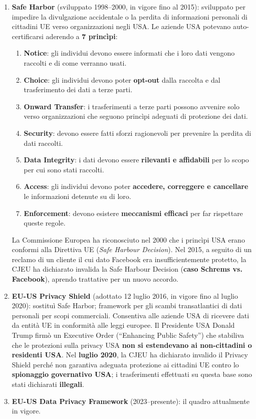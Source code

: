 \documentclass[a4paper,11pt]{article}
\begin{document}
\begin{enumerate}
  \item \textbf{Safe Harbor} (sviluppato 1998--2000, in vigore fino al 2015): sviluppato per impedire la divulgazione accidentale o la perdita di informazioni personali di cittadini UE verso organizzazioni negli USA. Le aziende USA potevano auto-certificarsi aderendo a \textbf{7 princìpi}:
  \begin{enumerate}
    \item \textbf{Notice}: gli individui devono essere informati che i loro dati vengono raccolti e di come verranno usati.
    \item \textbf{Choice}: gli individui devono poter \textbf{opt-out} dalla raccolta e dal trasferimento dei dati a terze parti.
    \item \textbf{Onward Transfer}: i trasferimenti a terze parti possono avvenire solo verso organizzazioni che seguono princìpi adeguati di protezione dei dati.
    \item \textbf{Security}: devono essere fatti sforzi ragionevoli per prevenire la perdita di dati raccolti.
    \item \textbf{Data Integrity}: i dati devono essere \textbf{rilevanti e affidabili} per lo scopo per cui sono stati raccolti.
    \item \textbf{Access}: gli individui devono poter \textbf{accedere, correggere e cancellare} le informazioni detenute su di loro.
    \item \textbf{Enforcement}: devono esistere \textbf{meccanismi efficaci} per far rispettare queste regole.
  \end{enumerate}
  La Commissione Europea ha riconosciuto nel 2000 che i princìpi USA erano conformi alla Direttiva UE (\emph{Safe Harbour Decision}). Nel 2015, a seguito di un reclamo di un cliente il cui dato Facebook era insufficientemente protetto, la CJEU ha dichiarato invalida la Safe Harbour Decision (\textbf{caso Schrems vs. Facebook}), aprendo trattative per un nuovo accordo.

  \item \textbf{EU-US Privacy Shield} (adottato 12 luglio 2016, in vigore fino al luglio 2020): sostitu\`{i} Safe Harbor; framework per gli scambi transatlantici di dati personali per scopi commerciali. Consentiva alle aziende USA di ricevere dati da entit\`{a} UE in conformit\`{a} alle leggi europee. Il Presidente USA Donald Trump firm\`{o} un Executive Order (``Enhancing Public Safety'') che stabiliva che le protezioni sulla privacy USA \textbf{non si estendevano ai non-cittadini o residenti USA}. Nel \textbf{luglio 2020}, la CJEU ha dichiarato invalido il Privacy Shield perch\'{e} non garantiva adeguata protezione ai cittadini UE contro lo \textbf{spionaggio governativo USA}; i trasferimenti effettuati su questa base sono stati dichiarati \textbf{illegali}.
  \item \textbf{EU-US Data Privacy Framework} (2023--presente): il quadro attualmente in vigore.
\end{enumerate}
\end{document}
